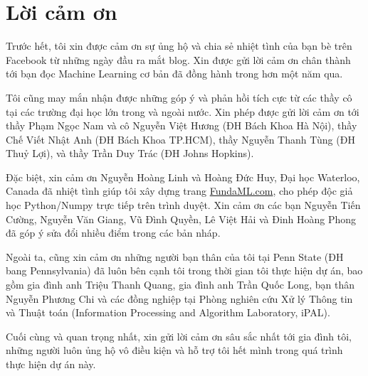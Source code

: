 



\section{Lời cảm ơn}
Trước hết, tôi xin được cảm ơn sự ủng hộ và chia sẻ nhiệt tình của bạn bè trên  Facebook từ những ngày đầu ra mắt blog. Xin được gửi lời cảm ơn chân thành tới bạn đọc Machine Learning cơ bản đã đồng hành trong hơn một năm qua.

Tôi cũng may mắn nhận được những góp ý và phản hồi tích cực từ các thầy cô
tại các trường đại học lớn trong và ngoài nước. Xin phép được gửi lời cảm ơn
tới thầy Phạm Ngọc Nam và cô Nguyễn Việt Hương (ĐH Bách Khoa Hà Nội), thầy Chế
Viết Nhật Anh (ĐH Bách Khoa TP.HCM), thầy Nguyễn Thanh Tùng (ĐH Thuỷ Lợi),
và thầy Trần Duy Trác (ĐH Johns Hopkins).

Đặc biệt, xin cảm ơn Nguyễn Hoàng Linh và Hoàng Đức Huy, Đại học Waterloo,
Canada đã nhiệt tình giúp tôi xây dựng trang \url{FundaML.com}, cho phép độc giả
học Python/Numpy trực tiếp trên trình duyệt. Xin cảm ơn các bạn Nguyễn
Tiến Cường, Nguyễn Văn Giang, Vũ Đình Quyền, Lê Việt Hải và Đinh Hoàng Phong đã
góp ý sửa đổi nhiều điểm trong các bản nháp.

Ngoài ta, cũng xin cảm ơn những người bạn thân của tôi tại Penn State
(ĐH bang Pennsylvania) đã luôn bên cạnh tôi trong thời gian tôi thực hiện dự án,
bao gồm gia đình anh Triệu Thanh Quang, gia đình anh Trần Quốc Long, bạn thân
Nguyễn Phương Chi và các đồng nghiệp tại Phòng nghiên cứu Xử lý Thông tin và
Thuật toán (Information Processing and Algorithm Laboratory, iPAL).

Cuối cùng và quan trọng nhất, xin gửi lời cảm ơn sâu sắc nhất tới gia đình tôi,
những người luôn ủng hộ vô điều kiện và hỗ trợ tôi hết mình trong quá trình thực
hiện dự án này.





